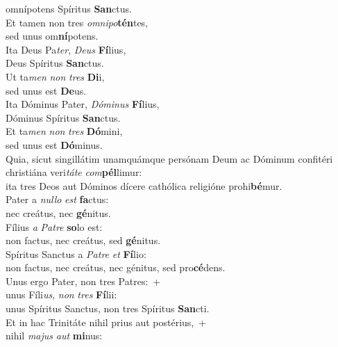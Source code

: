 \oddverse omnípotens Spíritus \textbf{San}ctus.\\
\evenverse Et tamen non tres \textit{om}\textit{ni}\textit{po}\textbf{tén}tes,~\*\\
\evenverse sed unus om\textbf{ní}potens.\\
\oddverse Ita Deus Pa\textit{ter}, \textit{De}\textit{us} \textbf{Fí}lius,~\*\\
\oddverse Deus Spíritus \textbf{San}ctus.\\
\evenverse Ut ta\textit{men} \textit{non} \textit{tres} \textbf{Di}i,~\*\\
\evenverse sed unus est \textbf{De}us.\\
\oddverse Ita Dóminus Pater, \textit{Dó}\textit{mi}\textit{nus} \textbf{Fí}lius,~\*\\
\oddverse Dóminus Spíritus \textbf{San}ctus.\\
\evenverse Et ta\textit{men} \textit{non} \textit{tres} \textbf{Dó}mini,~\*\\
\evenverse sed unus est \textbf{Dó}minus.\\
\oddverse Quia, sicut singillátim unamquámque persónam Deum ac Dóminum confitéri christiána veri\textit{tá}\textit{te} \textit{com}\textbf{pél}limur:~\*\\
\oddverse ita tres Deos aut Dóminos dícere cathólica religióne prohi\textbf{bé}mur.\\
\evenverse Pater a \textit{nul}\textit{lo} \textit{est} \textbf{fa}ctus:~\*\\
\evenverse nec creátus, nec \textbf{gé}nitus.\\
\oddverse Fílius \textit{a} \textit{Pa}\textit{tre} \textbf{so}lo est:~\*\\
\oddverse non factus, nec creátus, sed \textbf{gé}nitus.\\
\evenverse Spíritus Sanctus a \textit{Pa}\textit{tre} \textit{et} \textbf{Fí}lio:~\*\\
\evenverse non factus, nec creátus, nec génitus, sed pro\textbf{cé}dens.\\
\oddverse Unus ergo Pater, non tres Patres:~+\\
\oddverse  unus Fíli\textit{us}, \textit{non} \textit{tres} \textbf{Fí}lii:~\*\\
\oddverse unus Spíritus Sanctus, non tres Spíritus \textbf{San}cti.\\
\evenverse Et in hac Trinitáte nihil prius aut postérius,~+\\
\evenverse  nihil \textit{ma}\textit{jus} \textit{aut} \textbf{mi}nus:~\*\\
